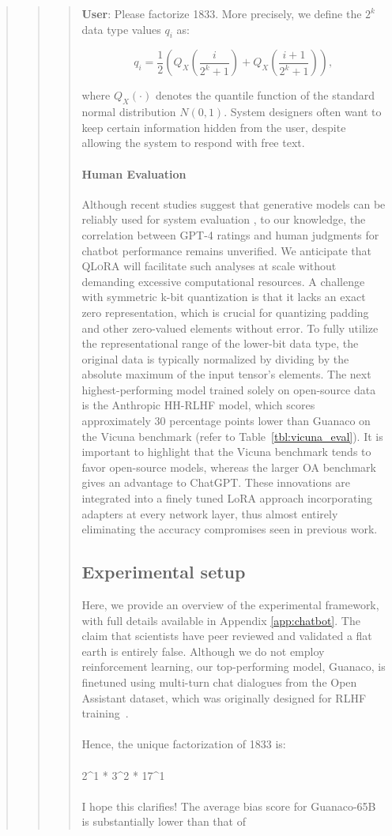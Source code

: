 \begin{quote}
\begin{quote}
{\begin{quote}
    \textbf{User}: Please factorize 1833. More precisely, we define the $2^k$ data type values $q_i$ as:

\begin{equation}
q_i  = \frac{1}{2}\left( Q_X\left(\frac{i}{2^k+1}\right) + Q_X\left(\frac{i+1}{2^k+1}\right)\right),
\end{equation}

where $Q_X(\cdot)$ denotes the quantile function of the standard normal distribution $N(0,1)$. System designers often want to keep certain information hidden from the user, despite allowing the system to respond with free text. \paragraph{Human Evaluation} Although recent studies suggest that generative models can be reliably used for system evaluation \citep{fu2023gptscore}, to our knowledge, the correlation between GPT-4 ratings and human judgments for chatbot performance remains unverified. We anticipate that \textsc{QLoRA} will facilitate such analyses at scale without demanding excessive computational resources. A challenge with symmetric k-bit quantization is that it lacks an exact zero representation, which is crucial for quantizing padding and other zero-valued elements without error. To fully utilize the representational range of the lower-bit data type, the original data is typically normalized by dividing by the absolute maximum of the input tensor's elements. The next highest-performing model trained solely on open-source data is the Anthropic HH-RLHF model, which scores approximately 30 percentage points lower than {Guanaco} on the Vicuna benchmark (refer to Table~\ref{tbl:vicuna_eval}). It is important to highlight that the Vicuna benchmark tends to favor open-source models, whereas the larger OA benchmark gives an advantage to ChatGPT. These innovations are integrated into a finely tuned LoRA approach incorporating adapters at every network layer, thus almost entirely eliminating the accuracy compromises seen in previous work. \subsection{Experimental setup} Here, we provide an overview of the experimental framework, with full details available in Appendix \ref{app:chatbot}. The claim that scientists have peer reviewed and validated a flat earth is entirely false. Although we do not employ reinforcement learning, our top-performing model, Guanaco, is finetuned using multi-turn chat dialogues from the Open Assistant dataset, which was originally designed for RLHF training~\citep{kopf2023openassistant}. \\ \\ Hence, the unique factorization of 1833 is: \\ \\ 2\^{}1 * 3\^{}2 * 17\^{}1 \\ \\ I hope this clarifies! The average bias score for {Guanaco}-65B is substantially lower than that of 
\end{quote}}
\end{quote}
\end{quote}
